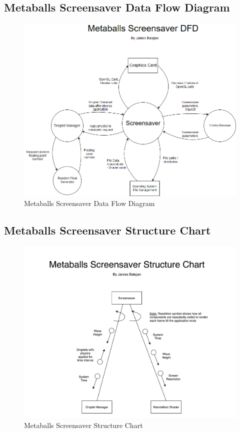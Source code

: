 \documentclass[10pt, openany]{book}
\begin{document}
\subsection{Metaballs Screensaver Data Flow Diagram}
\begin{figure}[H]
	\centering
	\includegraphics[width=1.0\linewidth]{Metaballs Screensaver DFD}
	\caption{Metaballs Screensaver Data Flow Diagram}
	\label{app:metaballs-dfd}
\end{figure}
\newpage

\subsection{Metaballs Screensaver Structure Chart}
\begin{figure}[H]
	\centering
	\includegraphics[width=1.0\linewidth]{Metaballs Screensaver Structure Chart}
	\caption{Metaballs Screensaver Structure Chart}
	\label{app:metaballs-struc}
\end{figure}
\newpage
\end{document}
